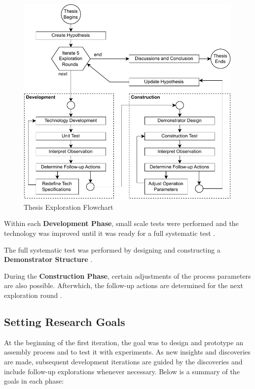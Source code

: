 \FloatBarrier
\begin{figure}[h]
    \centering
    \includegraphics[width=0.99\textwidth]{images/03/Research by Iterative Exploration.pdf}
    \caption{Thesis Exploration Flowchart}
    \label{fig:thesis-exploration-flowchart}
\end{figure}
\FloatBarrier

Within each \textbf{Development Phase}, small scale tests were performed and the technology was improved until it was ready for a full systematic test . 

The full systematic test was performed by designing and constructing a \textbf{Demonstrator Structure} . 

During the \textbf{Construction Phase}, certain adjustments of the process parameters are also possible. Afterwhich, the follow-up actions are determined for the next exploration round .

\subsection{Setting Research Goals}
\label{subsection:methodology-setting-research-goals}

At the beginning of the first iteration, the goal was to design and prototype an assembly process and to test it with experiments. As new insights and discoveries are made, subsequent development iterations are guided by the discoveries and include follow-up explorations whenever necessary. Below is a summary of the goals in each phase:

